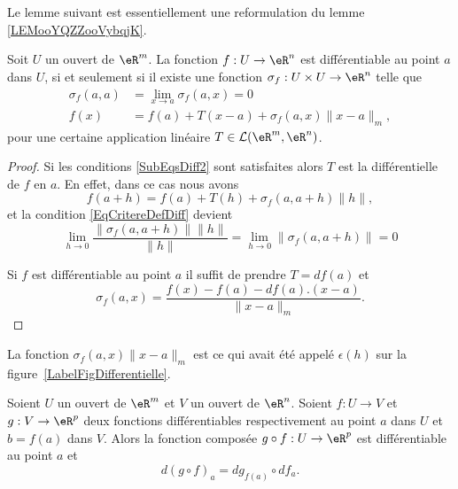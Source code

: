 Le lemme suivant est essentiellement une reformulation du lemme \ref{LEMooYQZZooVybqjK}.
\begin{lemma}\label{Def_diff2}
	Soit \( U\) un ouvert de \( \eR^m\). La fonction \( f: U\to\eR^n\) est différentiable au point \( a\) dans \( U\), si et seulement si il existe une fonction \( \sigma_f: U\times U\to \eR^n\) telle que
	\begin{subequations}		\label{SubEqsDiff2}
		\begin{align}
			\sigma_f(a,a) & =\lim_{x\to a} \sigma_f(a,x)=0                           \\
			f(x)          & =f(a)+T(x-a)+\sigma_f(a,x)\|x-a\|_m,   \label{def_diff2}
		\end{align}
	\end{subequations}
	pour une certaine application linéaire \( T\in\mathcal{L}(\eR^m,\eR^n)\).
\end{lemma}

\begin{proof}
	Si les conditions \eqref{SubEqsDiff2} sont satisfaites alors \( T\) est la différentielle de \( f\) en \( a\). En effet, dans ce cas nous avons
	\begin{equation}
		f(a+h)=f(a)+T(h)+\sigma_f(a,a+h)\| h \|,
	\end{equation}
	et la condition \eqref{EqCritereDefDiff} devient
	\begin{equation}
		\lim_{h\to 0} \frac{ \| \sigma_f(a,a+h) \|\| h \| }{ \| h \| }=\lim_{h\to 0} \| \sigma_f(a,a+h)\| =0
	\end{equation}


	Si \( f\) est différentiable au point \( a\) il suffit de prendre \( T=df(a)\) et
	\[
		\sigma_f(a,x)=\frac{f(x)-f(a)-df(a).(x-a)}{\|x-a\|_m}.
	\]
\end{proof}

\begin{remark}
	La fonction \( \sigma_f(a,x)\| x-a \|_m\) est ce qui avait été appelé \( \epsilon(h)\) sur la figure~\ref{LabelFigDifferentielle}.
\end{remark}

\begin{proposition}		\label{PropDiffCompose}
	Soient \( U\) un ouvert de \( \eR^m\) et \( V\) un ouvert de \( \eR^n\). Soient \( f: U\to V\)  et \( g: V \to \eR^p\) deux fonctions différentiables respectivement au point \( a\) dans \( U\) et \( b=f(a)\) dans \( V\). Alors la fonction composée \( g\circ f: U\to \eR^p \) est différentiable au point \( a\) et
	\begin{equation}	\label{EqDiffCompose}
		d(g\circ f)_a=dg_{f(a)}\circ df_a.
	\end{equation}
\end{proposition}

